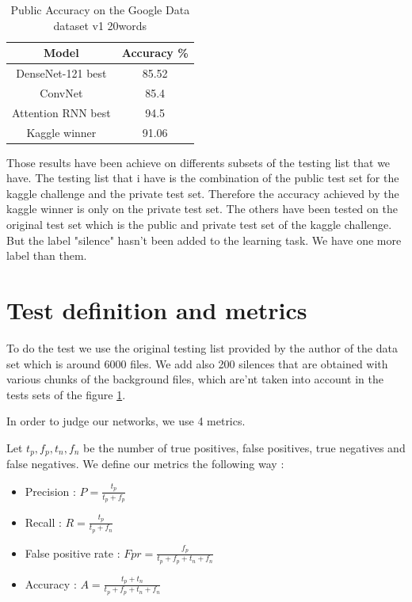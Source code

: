 
\begin{table}[h!]
    \centering
    \begin{tabular}{|c|c|}
        
        
        \hline
        Model & Accuracy \%  \\
        \hline
        DenseNet-121 best & 85.52 \\
        \hline
        ConvNet & 85.4 \\
        \hline
        Attention RNN best & 94.5 \\
        \hline
        Kaggle winner & 91.06\\
        \hline        
    \end{tabular}
    \caption{Public Accuracy on the Google Data dataset v1 20words }
    \label{tab:general}
\end{table}

Those results have been achieve on differents subsets of the testing list that we have. The testing list that i have is the combination of the public test set for the kaggle challenge and the private test set. Therefore the accuracy achieved by the kaggle winner is only on the private test set. The others have been tested on the original test set which is the public and private test set of the kaggle challenge. But the label "silence" hasn't been added to the learning task. We have one more label than them.


\section{Test definition and metrics}


To do the test we use the original testing list provided by the author of the data set which is around 6000 files. We add also 200 silences that are obtained with various chunks of the background files, which are'nt taken into account in the tests sets of the figure \ref{tab:general}.

\vspace{5mm}
In order to judge our networks, we use 4 metrics.

\vspace{5mm}

Let $t_p, f_p, t_n, f_n$ be the number of true positives, false positives, true negatives and false negatives. We define our metrics the following way :

\begin{itemize}
    \item Precision : $P = \frac{t_p}{t_p + f_p}$
    \item Recall : $R = \frac{t_p}{t_p + f_n}$
    \item False positive rate : $Fpr = \frac{f_p}{t_p + f_p + t_n + f_n}$
    \item Accuracy : $A = \frac{t_p + t_n}{t_p + f_p + t_n + f_n}$
\end{itemize}

